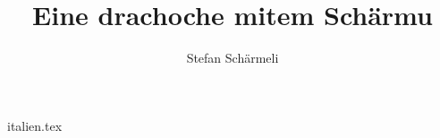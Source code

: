 \documentclass[a5paper,BCOR=12mm,german]{scrbook}
\begin{document}
    \title{Eine drachoche mitem Schärmu}
    \author{Stefan Schärmeli}
    \frontmatter
    \maketitle
    \tableofcontents
    \mainmatter
    {italien.tex}
\end{document}

